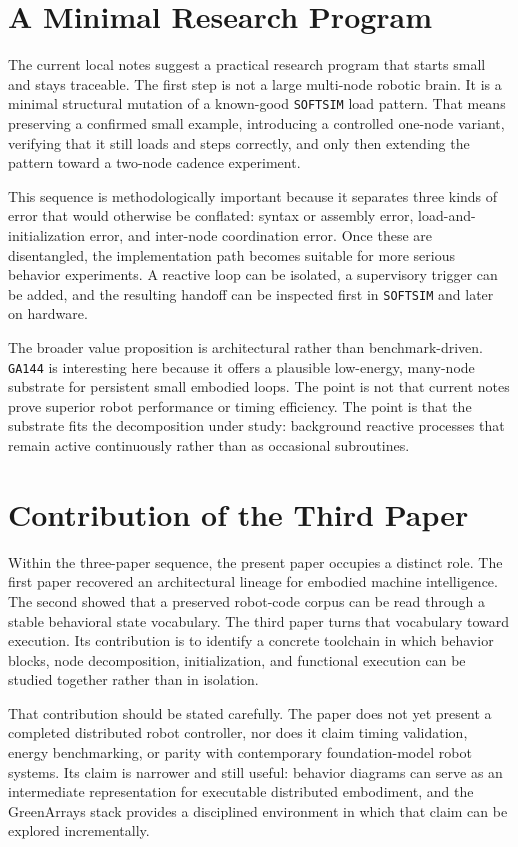 \documentclass[11pt]{article}
\begin{document}
\section{A Minimal Research Program}

The current local notes suggest a practical research program that starts
small and stays traceable. The first step is not a large multi-node robotic
brain. It is a minimal structural mutation of a known-good \texttt{SOFTSIM}
load pattern. That means preserving a confirmed small example, introducing a
controlled one-node variant, verifying that it still loads and steps
correctly, and only then extending the pattern toward a two-node cadence
experiment.

This sequence is methodologically important because it separates three kinds
of error that would otherwise be conflated: syntax or assembly error,
load-and-initialization error, and inter-node coordination error. Once these
are disentangled, the implementation path becomes suitable for more serious
behavior experiments. A reactive loop can be isolated, a supervisory trigger
can be added, and the resulting handoff can be inspected first in
\texttt{SOFTSIM} and later on hardware.

The broader value proposition is architectural rather than benchmark-driven.
\texttt{GA144} is interesting here because it offers a plausible low-energy,
many-node substrate for persistent small embodied loops. The point is not
that current notes prove superior robot performance or timing efficiency.
The point is that the substrate fits the decomposition under study:
background reactive processes that remain active continuously rather than as
occasional subroutines.

\section{Contribution of the Third Paper}

Within the three-paper sequence, the present paper occupies a distinct role.
The first paper recovered an architectural lineage for embodied machine
intelligence. The second showed that a preserved robot-code corpus can be
read through a stable behavioral state vocabulary. The third paper turns
that vocabulary toward execution. Its contribution is to identify a concrete
toolchain in which behavior blocks, node decomposition, initialization, and
functional execution can be studied together rather than in isolation.

That contribution should be stated carefully. The paper does not yet present
a completed distributed robot controller, nor does it claim timing
validation, energy benchmarking, or parity with contemporary foundation-model
robot systems. Its claim is narrower and still useful: behavior diagrams can
serve as an intermediate representation for executable distributed
embodiment, and the GreenArrays stack provides a disciplined environment in
which that claim can be explored incrementally.
\end{document}
